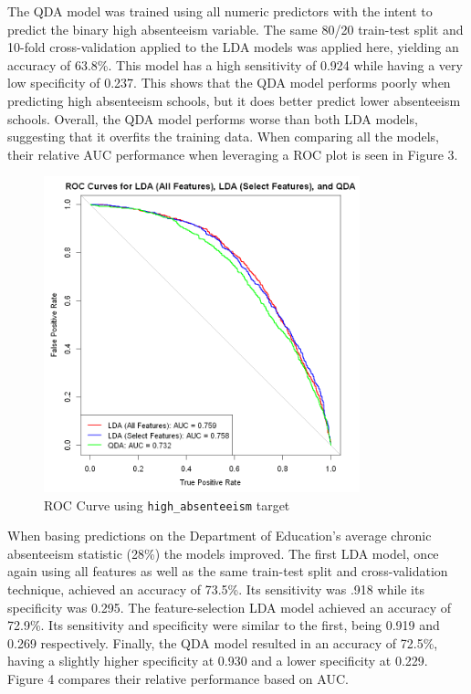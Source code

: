 \documentclass[
  11pt,
]{article}
\begin{document}
The QDA model was trained using all numeric predictors with the intent
to predict the binary high absenteeism variable. The same 80/20
train-test split and 10-fold cross-validation applied to the LDA models
was applied here, yielding an accuracy of 63.8\%. This model has a high
sensitivity of 0.924 while having a very low specificity of 0.237. This
shows that the QDA model performs poorly when predicting high
absenteeism schools, but it does better predict lower absenteeism
schools. Overall, the QDA model performs worse than both LDA models,
suggesting that it overfits the training data. When comparing all the
models, their relative AUC performance when leveraging a ROC plot is
seen in Figure 3.

\begin{figure}[H]

{\centering \includegraphics[width=3.6in,height=\textheight]{../images/lda-qda-roc.png}

}

\caption{ROC Curve using \texttt{high\_absenteeism} target}

\end{figure}%

When basing predictions on the Department of Education's average chronic
absenteeism statistic (28\%) the models improved. The first LDA model,
once again using all features as well as the same train-test split and
cross-validation technique, achieved an accuracy of 73.5\%. Its
sensitivity was .918 while its specificity was 0.295. The
feature-selection LDA model achieved an accuracy of 72.9\%. Its
sensitivity and specificity were similar to the first, being 0.919 and
0.269 respectively. Finally, the QDA model resulted in an accuracy of
72.5\%, having a slightly higher specificity at 0.930 and a lower
specificity at 0.229. Figure 4 compares their relative performance based
on AUC.
\end{document}
